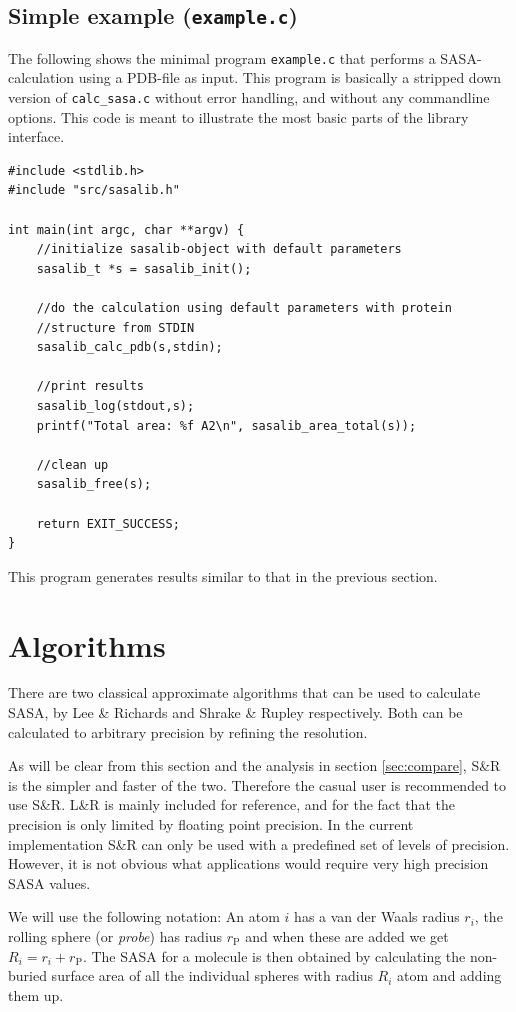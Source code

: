 \documentclass[a4paper,11pt]{article}
\begin{document}
\subsection{Simple example (\texttt{example.c})}\label{sec:simple_sample}

The following shows the minimal program \texttt{example.c} that
performs a SASA-calculation using a PDB-file as input. This program is
basically a stripped down version of \texttt{calc\_sasa.c} without
error handling, and without any commandline options. This code is
meant to illustrate the most basic parts of the library interface.
\begin{verbatim}
#include <stdlib.h>
#include "src/sasalib.h"

int main(int argc, char **argv) { 
    //initialize sasalib-object with default parameters
    sasalib_t *s = sasalib_init();

    //do the calculation using default parameters with protein
    //structure from STDIN
    sasalib_calc_pdb(s,stdin);

    //print results
    sasalib_log(stdout,s);
    printf("Total area: %f A2\n", sasalib_area_total(s));

    //clean up
    sasalib_free(s);

    return EXIT_SUCCESS;
}
\end{verbatim}
This program generates results similar to that in the previous
section.

\section{Algorithms}\label{sec:alg}

There are two classical approximate algorithms that can be used to
calculate SASA, by Lee \& Richards \cite{LnR} and Shrake \& Rupley
\cite{SnR} respectively. Both can be calculated to arbitrary precision
by refining the resolution. 

As will be clear from this section and the analysis in section
\ref{sec:compare}, S\&R is the simpler and faster of the
two. Therefore the casual user is recommended to use S\&R. L\&R is
mainly included for reference, and for the fact that the precision is
only limited by floating point precision. In the current
implementation S\&R can only be used with a predefined set of levels
of precision. However, it is not obvious what applications would
require very high precision SASA values.

We will use the following notation: An atom $i$ has a van der Waals
radius $r_i$, the rolling sphere (or \emph{probe}) has radius
$r_\text{P}$ and when these are added we get $R_i = r_i +
r_\text{P}$. The SASA for a molecule is then obtained by calculating
the non-buried surface area of all the individual spheres with radius
$R_i$ atom and adding them up.
\end{document}
